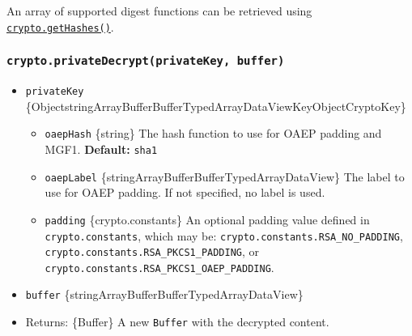 \begin{Shaded}
\begin{Highlighting}[]
\NormalTok{ \{}
\OperatorTok{,}
\NormalTok{\} }\OperatorTok{=} \NormalTok{(}\NormalTok{)}\OperatorTok{;}

\OperatorTok{=} \NormalTok{(}\OperatorTok{,} \OperatorTok{,} \OperatorTok{,} \OperatorTok{,} \NormalTok{)}\OperatorTok{;}
\NormalTok{(}\NormalTok{))}\OperatorTok{;}  
\end{Highlighting}
\end{Shaded}

An array of supported digest functions can be retrieved using
\hyperref[cryptogethashes]{\texttt{crypto.getHashes()}}.

\subsubsection{\texorpdfstring{\texttt{crypto.privateDecrypt(privateKey,\ buffer)}}{crypto.privateDecrypt(privateKey, buffer)}}\label{crypto.privatedecryptprivatekey-buffer}

\begin{itemize}
\tightlist
\item
  \texttt{privateKey}
  \{Object\textbar string\textbar ArrayBuffer\textbar Buffer\textbar TypedArray\textbar DataView\textbar KeyObject\textbar CryptoKey\}

  \begin{itemize}
  \tightlist
  \item
    \texttt{oaepHash} \{string\} The hash function to use for OAEP
    padding and MGF1. \textbf{Default:}
    \texttt{\textquotesingle{}sha1\textquotesingle{}}
  \item
    \texttt{oaepLabel}
    \{string\textbar ArrayBuffer\textbar Buffer\textbar TypedArray\textbar DataView\}
    The label to use for OAEP padding. If not specified, no label is
    used.
  \item
    \texttt{padding} \{crypto.constants\} An optional padding value
    defined in \texttt{crypto.constants}, which may be:
    \texttt{crypto.constants.RSA\_NO\_PADDING},
    \texttt{crypto.constants.RSA\_PKCS1\_PADDING}, or
    \texttt{crypto.constants.RSA\_PKCS1\_OAEP\_PADDING}.
  \end{itemize}
\item
  \texttt{buffer}
  \{string\textbar ArrayBuffer\textbar Buffer\textbar TypedArray\textbar DataView\}
\item
  Returns: \{Buffer\} A new \texttt{Buffer} with the decrypted content.
\end{itemize}

